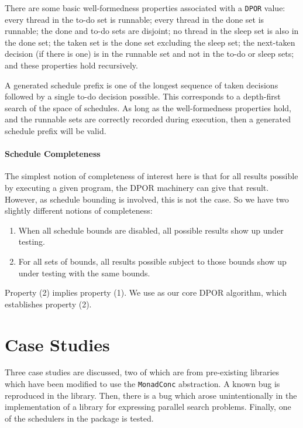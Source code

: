 There are some basic well-formedness properties associated with a
\verb|DPOR| value: every thread in the to-do set is runnable; every
thread in the done set is runnable; the done and to-do sets are
disjoint; no thread in the sleep set is also in the done set; the
taken set is the done set excluding the sleep set; the next-taken
decision (if there is one) is in the runnable set and not in the to-do
or sleep sets; and these properties hold recursively.

A generated schedule prefix is one of the longest sequence of taken
decisions followed by a single to-do decision possible.  This
corresponds to a depth-first search of the space of schedules.  As
long as the well-formedness properties hold, and the runnable sets are
correctly recorded during execution, then a generated schedule prefix
will be valid.

\paragraph{Schedule Completeness}
The simplest notion of completeness of interest here is that for all
results possible by executing a given program, the DPOR machinery can
give that result.  However, as schedule bounding is involved, this is
not the case.  So we have two slightly different notions of
completeness:

\begin{enumerate}
\item When all schedule bounds are disabled, all possible results show
  up under testing.
\item For all sets of bounds, all results possible subject to those
  bounds show up under testing with the same bounds.
\end{enumerate}

Property (2) implies property (1).  We use \cite{coons2013} as our
core DPOR algorithm, which establishes property (2).

\section{Case Studies}
\label{sec:dejafu-casestudies}

Three case studies are discussed, two of which are from pre-existing
libraries which have been modified to use the \verb|MonadConc|
abstraction.  A known bug is reproduced in the 
library.  Then, there is a bug which arose unintentionally in the
implementation of a library for expressing parallel search problems.
Finally, one of the schedulers in the  package is
tested.


